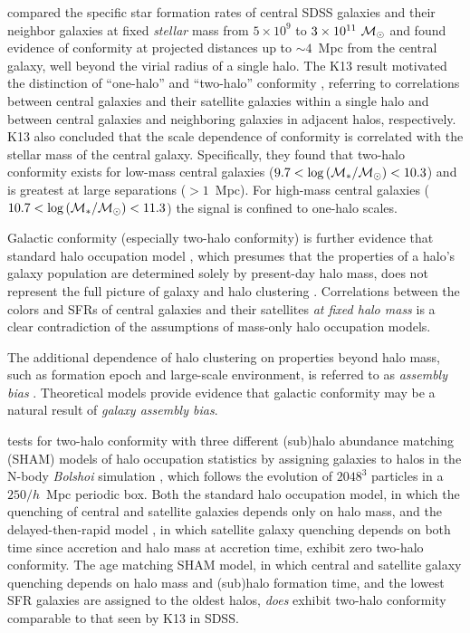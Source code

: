 \citet[][hereafter K13]{Kauffmann13} compared the specific star formation rates of central SDSS galaxies and their neighbor galaxies at fixed \emph{stellar} mass from $5\times10^9$ to $3\times10^{11}~\msun$ and found evidence of conformity at projected distances up to $\sim4$~Mpc from the central galaxy, well beyond the virial radius of a single halo.
The K13 result motivated the distinction of ``one-halo'' and ``two-halo'' conformity \citep*{Hearin15}, referring to correlations between central galaxies and their satellite galaxies within a single halo and between central galaxies and neighboring galaxies in adjacent halos, respectively.
K13 also concluded that the scale dependence of conformity is correlated with the stellar mass of the central galaxy.
Specifically, they found that two-halo conformity exists for low-mass central galaxies
(${9.7<\logM<10.3}$)
and is greatest at large separations ($>1$~Mpc).
For high-mass central galaxies (${10.7<\logM<11.3}$) the signal is confined to one-halo scales.

Galactic conformity (especially two-halo conformity) is further evidence that standard halo occupation model \citep{BerlindWeinberg02},
which presumes that the properties of a halo's galaxy population are determined solely by present-day halo mass,
does not represent the full picture of galaxy and halo clustering \citep[e.g.,][]{Kravtsov04}.
Correlations between the colors and SFRs of central galaxies and their satellites \emph{at fixed halo mass} is a clear contradiction of the assumptions of mass-only halo occupation models.

The additional dependence of halo clustering on properties beyond halo mass, such as formation epoch and large-scale environment, is referred to as \emph{assembly bias} \citep[e.g.,][]{GSW05, Wechsler06, Croton07, GaoWhite07, Zentner07, Dalal08, Tinker08, Sunayama16}.
Theoretical models provide evidence that galactic conformity may be a natural result of \emph{galaxy assembly bias}.

\citet{Hearin15} tests for two-halo conformity with three different (sub)halo abundance matching (SHAM) models of halo occupation statistics by assigning galaxies to halos in the N-body \emph{Bolshoi} simulation \citep{Klypin11}, which follows the evolution of $2048^3$ particles in a $250/h$~Mpc periodic box.
Both the standard halo occupation model, in which the quenching of central and satellite galaxies depends only on halo mass, and the delayed-then-rapid model \citep{Wetzel13}, in which satellite galaxy quenching depends on both time since accretion and halo mass at accretion time, exhibit zero two-halo conformity.
The age matching SHAM model, in which central and satellite galaxy quenching depends on halo mass and (sub)halo formation time, and the lowest SFR galaxies are assigned to the oldest halos, \emph{does} exhibit two-halo conformity comparable to that seen by K13 in SDSS.

